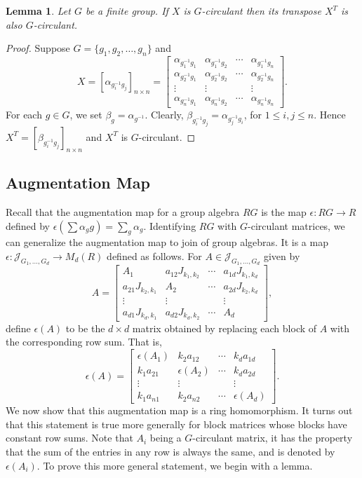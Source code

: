 \documentclass[12pt, a4paper]{amsart}
\numberwithin{equation}{section} %
\theoremstyle{plain}
\theoremstyle{definition}
\theoremstyle{plain}
\newtheorem{lem}[thm]{Lemma}
\theoremstyle{remark}
\newcommand{\sJ}{\mathcal{J}}
\begin{document}
\begin{lem} Let $G$ be a finite group. If $X$  is  $G$-circulant then its transpose $X^T$ is also $G$-circulant.  
\end{lem}
\begin{proof} Suppose  $G=\{g_1,g_2,\ldots,g_n\}$ and  
\[
X=[\alpha_{g_i^{-1}g_j}]_{n\times n}=\begin{bmatrix}
\alpha_{g_1^{-1}g_1} & \alpha_{g_1^{-1}g_2}&\cdots & \alpha_{g_1^{-1}g_n}\\
\alpha_{g_2^{-1}g_1} & \alpha_{g_2^{-1}g_2}&\cdots & \alpha_{g_2^{-1}g_n}\\
\vdots & \vdots & &\vdots\\
\alpha_{g_n^{-1}g_1} & \alpha_{g_n^{-1}g_2}&\cdots & \alpha_{g_n^{-1}g_n}
\end{bmatrix}.\] For each $g\in G$, we set $\beta_g=\alpha_{g^{-1}}$. Clearly, $\beta_{g_i^{-1}g_j}=\alpha_{g_j^{-1}g_i}$, for $1\leq i,j\leq n$. Hence $X^T=[\beta_{g_i^{-1}g_j}]_{n\times n}$ and $X^T$ is $G$-circulant.
\end{proof}


\subsection{Augmentation Map} Recall that the augmentation map for a group algebra $RG$ is the map $\epsilon \colon RG \rightarrow R$ defined  by $\epsilon(\sum \alpha_g g) = \sum_g \alpha_g$. Identifying  $RG$ with $G$-circulant matrices, we can  
  generalize the augmentation map to join of group algebras. It is a map $\epsilon\colon \sJ_{G_1,\ldots,G_d}\to M_d(R)$ defined as follows. For $A \in \sJ_{G_1,\ldots,G_d}$ given by 
\[A=\begin{bmatrix} 
A_1&a_{12} J_{k_1,k_2} &\cdots & a_{1d}J_{k_1,k_d}\\
a_{21}J_{k_2,k_1} &A_2 &\cdots & a_{2d}J_{k_2,k_d}\\
\vdots&\vdots& &\vdots\\
a_{d1}J_{k_d,k_1}&a_{d2}J_{k_d,k_2}&\cdots& A_d
\end{bmatrix},\]
define $\epsilon (A)$ to be the $d \times d$ matrix obtained  by replacing each block of $A$ with the corresponding row sum. That is, 
\[\epsilon (A) = \begin{bmatrix}
\epsilon(A_1) & k_2 a_{12} & \cdots  & k_d a_{1d} \\
k_1 a_{21} & \epsilon(A_2) & \cdots & k_d a_{2d} \\
\vdots&\vdots&  &\vdots\\
k_1a_{n1} & k_2a_{n2}& \cdots & \epsilon(A_d)
\end{bmatrix}.\]
 We now show that this augmentation map is a ring homomorphism. It turns out that this statement is true more generally for block matrices whose blocks have constant row sums. Note that $A_i$ being a $G$-circulant matrix, it has the property that the sum of the entries in any row  is always the same, and is denoted by $\epsilon(A_i)$. To prove this more general statement, we begin with a lemma.
\end{document}
